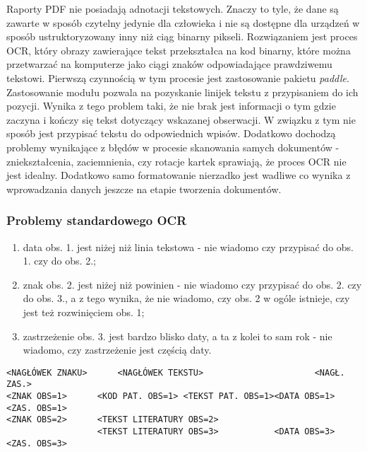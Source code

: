 Raporty \ac{PDF} nie posiadają adnotacji tekstowych. 
Znaczy to tyle, że dane są zawarte w sposób czytelny
jedynie dla człowieka i nie są dostępne dla urządzeń w sposób
ustruktoryzowany inny niż ciąg binarny pikseli.
Rozwiązaniem jest proces \ac{OCR}, który obrazy zawierające tekst
przekształca na kod binarny, które można przetwarzać na komputerze
jako ciągi znaków odpowiadające prawdziwemu tekstowi. Pierwszą
czynnością w tym procesie jest zastosowanie pakietu \textit{paddle}.
Zastosowanie modułu pozwala na pozyskanie linijek tekstu z przypisaniem
do ich pozycji. Wynika z tego problem taki, że nie brak jest informacji
o tym gdzie zaczyna i kończy się tekst dotyczący wskazanej obserwacji.
W związku z tym nie sposób jest przypisać tekstu do odpowiednich
wpisów. Dodatkowo dochodzą problemy wynikające z błędów w procesie
skanowania samych dokumentów - zniekształcenia, zaciemnienia, czy
rotacje kartek sprawiają, że proces \ac{OCR} nie jest idealny.
Dodatkowo samo formatowanie nierzadko jest wadliwe co wynika
z wprowadzania danych jeszcze na etapie tworzenia dokumentów.



\subsubsection{Problemy standardowego \ac{OCR}}

\begin{enumerate}
\item data obs. 1. jest niżej niż linia tekstowa - 
nie wiadomo czy przypisać do obs. 1. czy do obs. 2.;
\item znak obs. 2. jest niżej niż powinien - nie wiadomo
czy przypisać do obs. 2. czy do obs. 3., a z tego wynika,
że nie wiadomo, czy obs. 2 w ogóle istnieje, czy jest też
rozwinięciem obs. 1;
\item zastrzeżenie obs. 3. jest bardzo blisko daty, a ta
z kolei to sam rok - nie wiadomo, czy zastrzeżenie jest częścią
daty.
\end{enumerate}

\begin{verbatim}
<NAGŁÓWEK ZNAKU>      <NAGŁÓWEK TEKSTU>                      <NAGŁ. ZAS.>
<ZNAK OBS=1>      <KOD PAT. OBS=1> <TEKST PAT. OBS=1><DATA OBS=1> <ZAS. OBS=1>
<ZNAK OBS=2>      <TEKST LITERATURY OBS=2>
                  <TEKST LITERATURY OBS=3>           <DATA OBS=3> <ZAS. OBS=3>
\end{verbatim}

